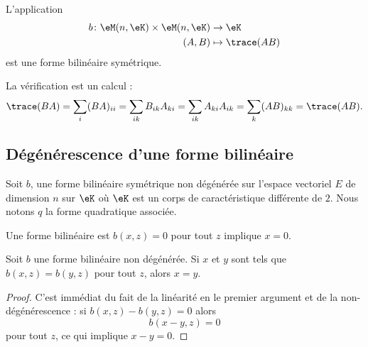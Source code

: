 \begin{example}
	L'application
	\begin{equation}
		\begin{aligned}
			b\colon \eM(n,\eK)\times \eM(n,\eK) & \to \eK            \\
			(A,B)                               & \mapsto \trace(AB)
		\end{aligned}
	\end{equation}
	est une forme bilinéaire symétrique.

	La vérification est un calcul :
	\begin{equation}
		\trace(BA)=\sum_{i}(BA)_{ii}=\sum_{ik}B_{ik}A_{ki}=\sum_{ik}A_{ki}A_{ik}=\sum_k(AB)_{kk}=\trace(AB).
	\end{equation}
\end{example}

\subsection{Dégénérescence d'une forme bilinéaire}

Soit \( b\), une forme bilinéaire symétrique non dégénérée  sur l'espace vectoriel \( E\) de dimension \( n\) sur \( \eK\) où \( \eK\) est un corps de caractéristique différente de \( 2\). Nous notons \( q\) la forme quadratique associée.

\begin{definition}      \label{DEFooNUBFooLfCqaK}
	Une forme bilinéaire est  \( b(x,z)=0\) pour tout \( z\) implique \( x=0\).
\end{definition}

\begin{lemma}   \label{LemyKJpVP}
	Soit \( b\) une forme bilinéaire non dégénérée. Si \( x\) et \( y\) sont tels que \( b(x,z)=b(y,z)\) pour tout \( z\), alors \( x=y\).
\end{lemma}

\begin{proof}
	C'est immédiat du fait de la linéarité en le premier argument et de la non-dégénérescence : si \( b(x,z)-b(y,z)=0\) alors
	\begin{equation}
		b(x-y,z)=0
	\end{equation}
	pour tout \( z\), ce qui implique \( x-y=0\).
\end{proof}


